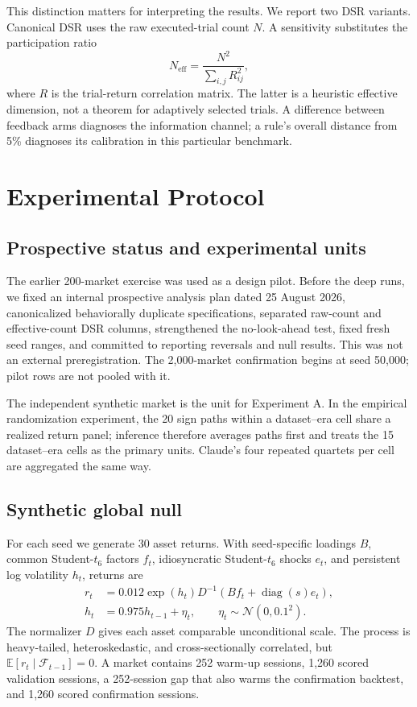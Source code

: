\documentclass[sigconf,nonacm]{acmart}
\begin{document}
This distinction matters for interpreting the results. We report two DSR
variants. Canonical DSR uses the raw executed-trial count $N$. A sensitivity
substitutes the participation ratio
\begin{equation}
  N_{\mathrm{eff}}=\frac{N^2}{\sum_{i,j}R_{ij}^{2}},
\end{equation}
where $R$ is the trial-return correlation matrix. The latter is a heuristic
effective dimension, not a theorem for adaptively selected trials. A difference
between feedback arms diagnoses the information channel; a rule's overall
distance from 5\% diagnoses its calibration in this particular benchmark.

\section{Experimental Protocol}

\subsection{Prospective status and experimental units}

The earlier 200-market exercise was used as a design pilot. Before the deep
runs, we fixed an internal prospective analysis plan dated 25 August 2026,
canonicalized behaviorally duplicate specifications, separated raw-count and
effective-count DSR columns, strengthened the no-look-ahead test, fixed fresh
seed ranges, and committed to reporting reversals and null results. This was not
an external preregistration. The 2,000-market confirmation begins at seed
50,000; pilot rows are not pooled with it.

The independent synthetic market is the unit for Experiment A. In the empirical
randomization experiment, the 20 sign paths within a dataset--era cell share a
realized return panel; inference therefore averages paths first and treats the
15 dataset--era cells as the primary units. Claude's four repeated quartets per
cell are aggregated the same way.

\subsection{Synthetic global null}

For each seed we generate $30$ asset returns. With seed-specific loadings $B$,
common Student-$t_6$ factors $f_t$, idiosyncratic Student-$t_6$ shocks $e_t$,
and persistent log volatility $h_t$, returns are
\begin{align}
 r_t &= 0.012\exp(h_t)D^{-1}
       \left(Bf_t+\operatorname{diag}(s)e_t\right),\\
 h_t &= 0.975h_{t-1}+\eta_t,\qquad
 \eta_t\sim\mathcal{N}(0,0.1^2).
\end{align}
The normalizer $D$ gives each asset comparable unconditional scale. The process
is heavy-tailed, heteroskedastic, and cross-sectionally correlated, but
$\mathbb{E}[r_t\mid\mathcal{F}_{t-1}]=0$. A market contains 252 warm-up
sessions, 1,260 scored validation sessions, a 252-session gap that also warms
the confirmation backtest, and 1,260 scored confirmation sessions.
\end{document}
